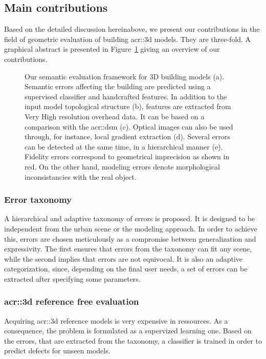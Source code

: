     \subsection{Main contributions}
        \label{sec::introduction::contributions::contributions}
        Based on the detailed discussion hereinabove, we present our contributions in the field of geometric evaluation of building \gls{acr::3d} models.
        They are three-fold.
        A graphical abstract is presented in Figure~\ref{fig::graphical_abstract} giving an overview of our contributions.
        \begin{figure}[htpb]
            \centering
                        
            \caption{
                \label{fig::graphical_abstract} Our semantic evaluation framework for 3D building models (a).
                Semantic errors affecting the building are predicted using a supervised classifier and handcrafted features.
                In addition to the input model topological structure (b), features are extracted from Very High resolution overhead data.
                It can be based on a comparison with the \gls*{acr::dsm} (c).
                Optical images can also be used through, for instance, local gradient extraction (d).
                Several errors can be detected at the same time, in a hierarchical manner (e).
                Fidelity errors correspond to geometrical imprecision as shown in red.
                On the other hand, modeling errors denote morphological inconsistancies with the real object.
            }
        \end{figure}
        \subsubsection{Error taxonomy}
            A hierarchical and adaptive taxonomy of errors is proposed.
            It is designed to be independent from the urban scene or the modeling approach.
            In order to achieve this, errors are chosen meticulously as a compromise between generalization and expressivity.
            The first ensures that errors from the taxonomy can fit any scene, while the second implies that errors are not equivocal.
            It is also an adaptive categorization, since, depending on the final user needs, a set of errors can be extracted after specifying some parameters.
            
        \subsubsection{\gls*{acr::3d} reference free evaluation}
            Acquiring \gls{acr::3d} reference models is very expensive in ressources.
            As a consequence, the problem is formulated as a supervized learning one.
            Based on the errors, that are extracted from the taxonomy, a classifier is trained in order to predict defects for unseen models.

